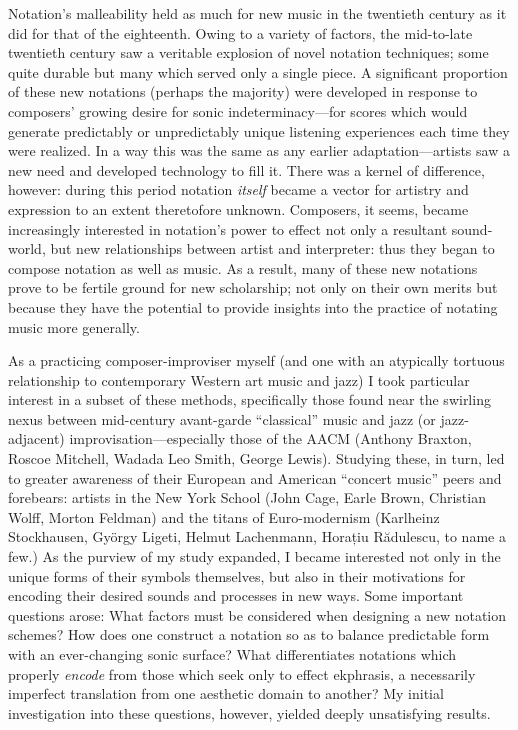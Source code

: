 Notation's malleability held as much for new music in the twentieth century as it did for that of the eighteenth. 
Owing to a variety of factors, the mid-to-late twentieth century saw a veritable explosion of novel notation techniques; some quite durable but many which served only a single piece.
A significant proportion of these new notations (perhaps the majority) were developed in response to composers' growing desire for sonic indeterminacy---for scores which would generate predictably or unpredictably unique listening experiences each time they were realized. 
In a way this was the same as any earlier adaptation---artists saw a new need and developed technology to fill it.
There was a kernel of difference, however: during this period notation \textit{itself} became a vector for artistry and expression to an extent theretofore unknown.
Composers, it seems, became increasingly interested in notation's power to effect not only a resultant sound-world, but new relationships between artist and interpreter: thus they began to compose notation as well as music.
As a result, many of these new notations prove to be fertile ground for new scholarship; not only on their own merits but because they have the potential to provide insights into the practice of notating music more generally. 

As a practicing composer-improviser myself (and one with an atypically tortuous relationship to contemporary Western art music and jazz) I took particular interest in a subset of these methods, specifically those found near the swirling nexus between mid-century avant-garde ``classical'' music and jazz (or jazz-adjacent) improvisation---especially those of the AACM (Anthony Braxton, Roscoe Mitchell, Wadada Leo Smith, George Lewis).
Studying these, in turn, led to greater awareness of their European and American ``concert music'' peers and forebears: artists in the New York School (John Cage, Earle Brown, Christian Wolff, Morton Feldman) and the titans of Euro-modernism (Karlheinz Stockhausen, Gy\"orgy Ligeti, Helmut Lachenmann, Horațiu R\u{a}dulescu, to name a few.)
As the purview of my study expanded, I became interested not only in the unique forms of their symbols themselves, but also in their motivations for encoding their desired sounds and processes in new ways.
Some important questions arose: What factors must be considered when designing a new notation schemes? 
How does one construct a notation so as to balance predictable form with an ever-changing sonic surface?
What differentiates notations which properly \textit{encode} from those which seek only to effect ekphrasis, a necessarily imperfect translation from one aesthetic domain to another? 
My initial investigation into these questions, however, yielded deeply unsatisfying results. 

